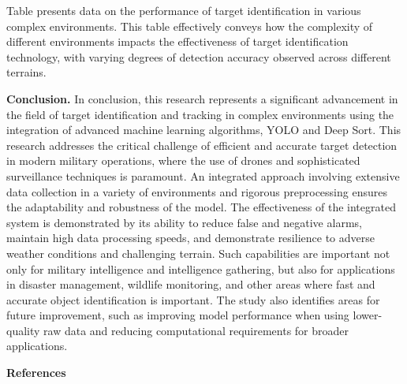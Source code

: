 \begin{multicols}{2}
Table presents data on the performance of target identification in
various complex environments. This table effectively conveys how the
complexity of different environments impacts the effectiveness of target
identification technology, with varying degrees of detection accuracy
observed across different terrains.

{\bfseries Conclusion.} In conclusion, this research represents a
significant advancement in the field of target identification and
tracking in complex environments using the integration of advanced
machine learning algorithms, YOLO and Deep Sort. This research addresses
the critical challenge of efficient and accurate target detection in
modern military operations, where the use of drones and sophisticated
surveillance techniques is paramount. An integrated approach involving
extensive data collection in a variety of environments and rigorous
preprocessing ensures the adaptability and robustness of the model. The
effectiveness of the integrated system is demonstrated by its ability to
reduce false and negative alarms, maintain high data processing speeds,
and demonstrate resilience to adverse weather conditions and challenging
terrain. Such capabilities are important not only for military
intelligence and intelligence gathering, but also for applications in
disaster management, wildlife monitoring, and other areas where fast and
accurate object identification is important. The study also identifies
areas for future improvement, such as improving model performance when
using lower-quality raw data and reducing computational requirements for
broader applications.
\end{multicols}

\begin{center}
{\bfseries References}
\end{center}

